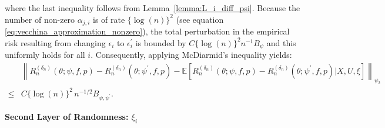 \documentclass[12pt]{article}
\newcommand{\E}{\mathbb{E}}
\begin{document}
where the last inequality follows from Lemma~\ref{lemma:L_i_diff_psi}. Because the number of non-zero $\alpha_{j,i}$ is of rate $\{\log(n)\}^2$ (see equation \eqref{eq:vecchina_approximation_nonzero}), the total perturbation in the empirical risk resulting from changing $\epsilon_i$ to $\epsilon_i^\prime$ is bounded by $C\{\log(n)\}^2 n^{-1} B_\psi$ and this uniformly holds for all $i$. Consequently, applying McDiarmid's inequality yields:
\begin{align*}
    &\left\|R_n^{(\delta_n)}(\theta;\psi,f,p)-R_n^{({\delta_n})}(\theta;\psi^\prime,f,p)-\E\left[R_n^{(\delta_n)}(\theta;\psi,f,p)-R_n^{({\delta_n})}(\theta;\psi^\prime,f,p)|X,U,\xi\right]\right\|_{\psi_2}\\
    \leq & C\{\log(n)\}^2\, n^{-1/2} B_{\psi,\psi^\prime}.
\end{align*}

\noindent\textbf{Second Layer of Randomness: $\xi_i$}
\end{document}
